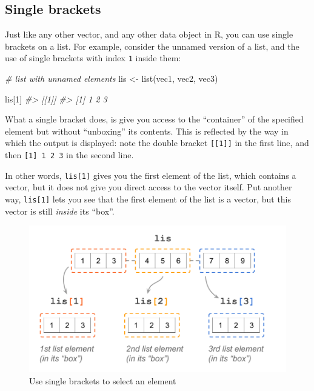 \documentclass[
]{book}
\newenvironment{Shaded}{\begin{snugshade}}{\end{snugshade}}
\newcommand{\CommentTok}[1]{\textcolor[rgb]{0.56,0.35,0.01}{\textit{#1}}}
\newcommand{\DecValTok}[1]{\textcolor[rgb]{0.00,0.00,0.81}{#1}}
\newcommand{\FunctionTok}[1]{\textcolor[rgb]{0.00,0.00,0.00}{#1}}
\newcommand{\NormalTok}[1]{#1}
\newcommand{\OtherTok}[1]{\textcolor[rgb]{0.56,0.35,0.01}{#1}}
\begin{document}
\hypertarget{single-brackets}{%
\subsection{Single brackets}\label{single-brackets}}

Just like any other vector, and any other data object in R, you can use single
brackets on a list. For example, consider the unnamed version of a list, and
the use of single brackets with index \texttt{1} inside them:

\begin{Shaded}
\begin{Highlighting}[]
\CommentTok{\# list with unnamed elements}
\NormalTok{lis }\OtherTok{\textless{}{-}} \FunctionTok{list}\NormalTok{(vec1, vec2, vec3)}

\NormalTok{lis[}\DecValTok{1}\NormalTok{]}
\CommentTok{\#\textgreater{} [[1]]}
\CommentTok{\#\textgreater{} [1] 1 2 3}
\end{Highlighting}
\end{Shaded}

What a single bracket does, is give you access to the ``container'' of the
specified element but without ``unboxing'' its contents. This is reflected by
the way in which the output is displayed: note the double bracket \texttt{{[}{[}1{]}{]}} in
the first line, and then \texttt{{[}1{]}\ 1\ 2\ 3} in the second line.

In other words, \texttt{lis{[}1{]}} gives you the first element of the list, which
contains a vector, but it does not give you direct access to the vector itself.
Put another way, \texttt{lis{[}1{]}} lets you see that the first element of the list is
a vector, but this vector is still \emph{inside} its ``box''.

\begin{figure}

{\centering \includegraphics[width=0.75\linewidth]{images/objects/obj-list-brackets2} 

}

\caption{Use single brackets to select an element}\label{fig:unnamed-chunk-120}
\end{figure}
\end{document}
